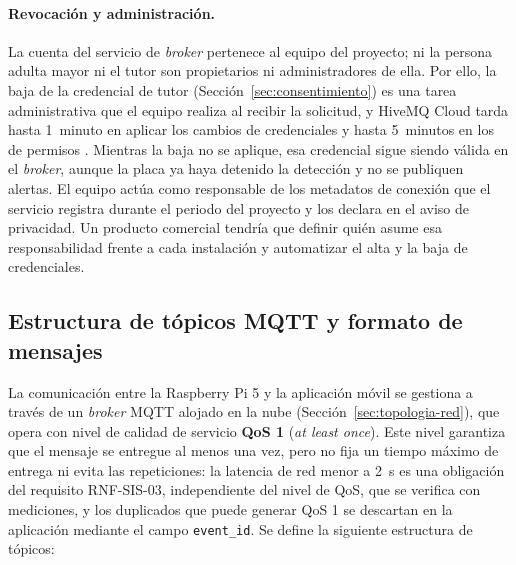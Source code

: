 \documentclass[12pt,a4paper,oneside]{book}
\theoremstyle{plain}
\theoremstyle{definition}
\theoremstyle{remark}
\begin{document}
\paragraph{Revocación y administración.} La cuenta del servicio de \textit{broker} pertenece al equipo del proyecto; ni la persona adulta mayor ni el tutor son propietarios ni administradores de ella. Por ello, la baja de la credencial de tutor (Sección~\ref{sec:consentimiento}) es una tarea administrativa que el equipo realiza al recibir la solicitud, y HiveMQ Cloud tarda hasta 1~minuto en aplicar los cambios de credenciales y hasta 5~minutos en los de permisos \parencite{hivemq2026acceso}. Mientras la baja no se aplique, esa credencial sigue siendo válida en el \textit{broker}, aunque la placa ya haya detenido la detección y no se publiquen alertas. El equipo actúa como responsable de los metadatos de conexión que el servicio registra durante el periodo del proyecto y los declara en el aviso de privacidad. Un producto comercial tendría que definir quién asume esa responsabilidad frente a cada instalación y automatizar el alta y la baja de credenciales.

\subsection{Estructura de tópicos MQTT y formato de mensajes}
\label{sec:mqtt-topicos}
La comunicación entre la Raspberry Pi 5 y la aplicación móvil se gestiona a través de un \textit{broker} MQTT alojado en la nube (Sección~\ref{sec:topologia-red}), que opera con nivel de calidad de servicio \textbf{QoS 1} (\textit{at least once}). Este nivel garantiza que el mensaje se entregue al menos una vez, pero no fija un tiempo máximo de entrega ni evita las repeticiones: la latencia de red menor a 2~s es una obligación del requisito RNF-SIS-03, independiente del nivel de QoS, que se verifica con mediciones, y los duplicados que puede generar QoS 1 se descartan en la aplicación mediante el campo \texttt{event\_id}. Se define la siguiente estructura de tópicos:
\end{document}
